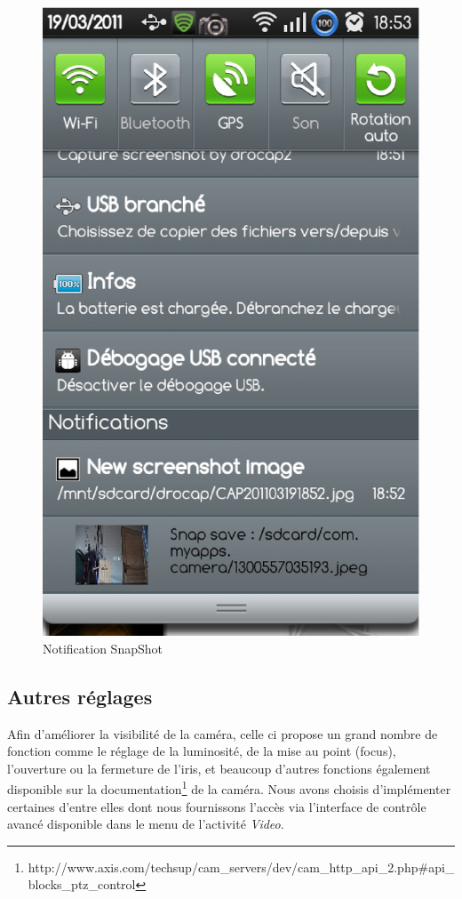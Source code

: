 \begin{figure}[H]
  \label{notification}
  \centering
   \includegraphics[scale=0.3]{Images/notification.eps}
  \caption{Notification SnapShot}
\end{figure}  

\subsection{Autres réglages}
Afin d'améliorer la visibilité de la caméra, celle ci propose un grand nombre
de fonction comme le réglage de la luminosité, de la mise au point
(focus), l'ouverture ou la fermeture de l'iris, et beaucoup d'autres fonctions
également disponible sur la
documentation\footnote{\label{MjpegView}http://www.axis.com/techsup/cam\_servers/dev/cam\_http\_api\_2.php\#api\_blocks\_ptz\_control}
de la caméra.\newline
\indent Nous avons choisis d'implémenter certaines d'entre elles dont nous
fournissons l'accès via l'interface de contrôle avancé disponible dans le menu
de l'activité \textit{Video}.

